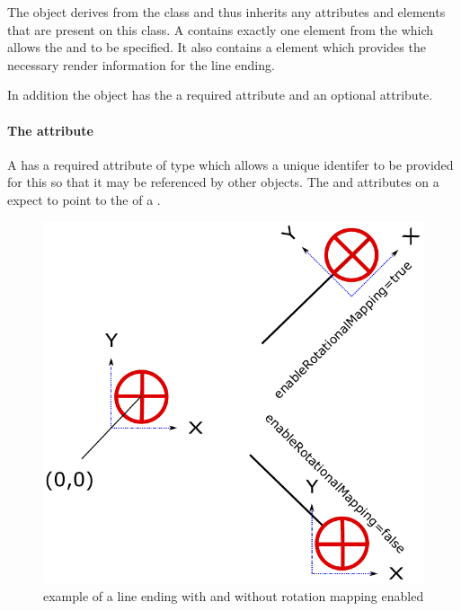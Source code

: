 The \LineEnding object derives from the \GraphicalPrimitiveTwoD class
and thus inherits any attributes and elements that are present on this
class.
A \LineEnding contains exactly one  element from the \LayoutPackage which allows the  and  to be specified. It also contains a \RenderGroup element which provides the necessary render information for the line ending.
  
In addition the \LineEnding object has the a required  attribute and an optional  attribute.

\paragraph{The \fixttspace{} attribute}

A \LineEnding has a required attribute  of type
 which allows a unique identifer to be provided for this \LineEnding so that it may be referenced by other objects. The  and  attributes on a \RenderCurve expect to point to the  of a \LineEnding.

\begin{figure}[!h]
\begin{center}
\includegraphics{figures/EnableRotationalMapping.pdf}
\end{center}
\caption{example of a line ending with and without rotation mapping enabled}
\label{EnableRotationalMapping}
\end{figure}

